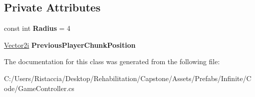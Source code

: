 \subsection*{Private Attributes}
\begin{DoxyCompactItemize}
\item 
\mbox{\label{class_game_controller_a4f2e71d7de3db56d3e53df1030b8cd69}} 
const int {\bfseries Radius} = 4
\item 
\mbox{\label{class_game_controller_a613781ec69632cd078c4e397ffc3fec6}} 
\hyperlink{class_terrain_generator_1_1_vector2i}{Vector2i} {\bfseries Previous\+Player\+Chunk\+Position}
\end{DoxyCompactItemize}


The documentation for this class was generated from the following file\+:\begin{DoxyCompactItemize}
\item 
C\+:/\+Users/\+Ristaccia/\+Desktop/\+Rehabilitation/\+Capstone/\+Assets/\+Prefabs/\+Infinite/\+Code/Game\+Controller.\+cs\end{DoxyCompactItemize}
